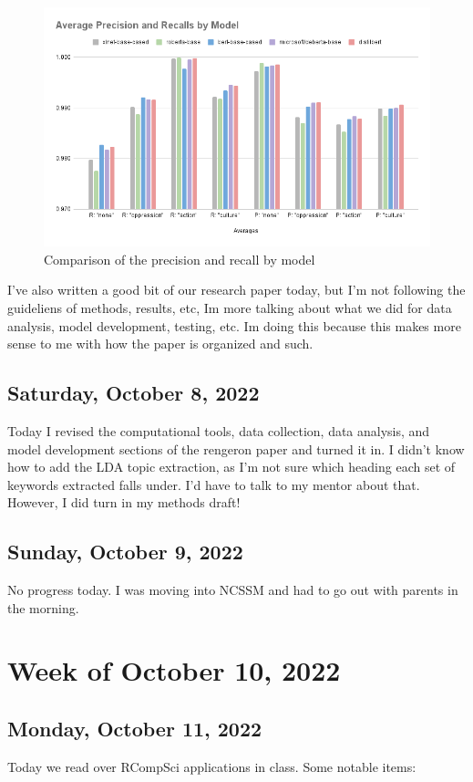 \documentclass[11pt,letterpaper]{article}
\begin{document}
\begin{figure}
    \centering
    \includegraphics[scale=0.6]{images/compare_PR.png}
    \caption{Comparison of the precision and recall by model}
    \label{fig:compare_PR.png}
\end{figure}

I've also written a good bit of our research paper today, but I'm not following the guideliens of methods, results, etc, Im more talking about what we did for data analysis, model development, testing, etc. Im doing this because this makes more sense to me with how the paper is organized and such.

\subsection{Saturday, October 8, 2022}
Today I revised the computational tools, data collection, data analysis, and model development sections of the rengeron paper and turned it in. I didn't know how to add the LDA topic extraction, as I'm not sure which heading each set of keywords extracted falls under. I'd have to talk to my mentor about that. However, I did turn in my methods draft!

\subsection{Sunday, October 9, 2022}
No progress today. I was moving into NCSSM and had to go out with parents in the morning.

\section{Week of October 10, 2022}
\subsection{Monday, October 11, 2022}
Today we read over RCompSci applications in class. Some notable items:
\end{document}
